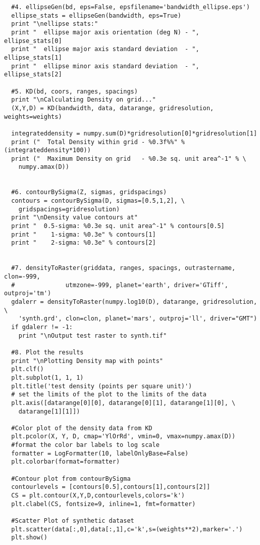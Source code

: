 \documentclass[12pt,letter]{article}
\begin{document}
\begin{verbatim}
  #4. ellipseGen(bd, eps=False, epsfilename='bandwidth_ellipse.eps')
  ellipse_stats = ellipseGen(bandwidth, eps=True)
  print "\nellipse stats:"
  print "  ellipse major axis orientation (deg N) - ", ellipse_stats[0]
  print "  ellipse major axis standard deviation  - ", ellipse_stats[1]
  print "  ellipse minor axis standard deviation  - ", ellipse_stats[2]
  
  #5. KD(bd, coors, ranges, spacings)
  print "\nCalculating Density on grid..."
  (X,Y,D) = KD(bandwidth, data, datarange, gridresolution, weights=weights)
  
  integrateddensity = numpy.sum(D)*gridresolution[0]*gridresolution[1]
  print ("  Total Density within grid - %0.3f%%" % (integrateddensity*100))
  print ("  Maximum Density on grid   - %0.3e sq. unit area^-1" % \
    numpy.amax(D))
    
  
  #6. contourBySigma(Z, sigmas, gridspacings)
  contours = contourBySigma(D, sigmas=[0.5,1,2], \ 
    gridspacings=gridresolution)
  print "\nDensity value contours at"
  print "  0.5-sigma: %0.3e sq. unit area^-1" % contours[0.5]
  print "    1-sigma: %0.3e" % contours[1]
  print "    2-sigma: %0.3e" % contours[2]
  
  
  #7. densityToRaster(griddata, ranges, spacings, outrastername, clon=-999, 
  #              utmzone=-999, planet='earth', driver='GTiff', outproj='tm')
  gdalerr = densityToRaster(numpy.log10(D), datarange, gridresolution, \
    'synth.grd', clon=clon, planet='mars', outproj='ll', driver="GMT")
  if gdalerr != -1:
    print "\nOutput test raster to synth.tif"
  
  #8. Plot the results
  print "\nPlotting Density map with points"
  plt.clf()
  plt.subplot(1, 1, 1)
  plt.title('test density (points per square unit)')
  # set the limits of the plot to the limits of the data
  plt.axis([datarange[0][0], datarange[0][1], datarange[1][0], \
    datarange[1][1]])
  
  #Color plot of the density data from KD
  plt.pcolor(X, Y, D, cmap='YlOrRd', vmin=0, vmax=numpy.amax(D))
  #format the color bar labels to log scale
  formatter = LogFormatter(10, labelOnlyBase=False) 
  plt.colorbar(format=formatter)
  
  #Contour plot from contourBySigma
  contourlevels = [contours[0.5],contours[1],contours[2]]
  CS = plt.contour(X,Y,D,contourlevels,colors='k')
  plt.clabel(CS, fontsize=9, inline=1, fmt=formatter)
  
  #Scatter Plot of synthetic dataset
  plt.scatter(data[:,0],data[:,1],c='k',s=(weights**2),marker='.')
  plt.show()
\end{verbatim}
\end{document}
